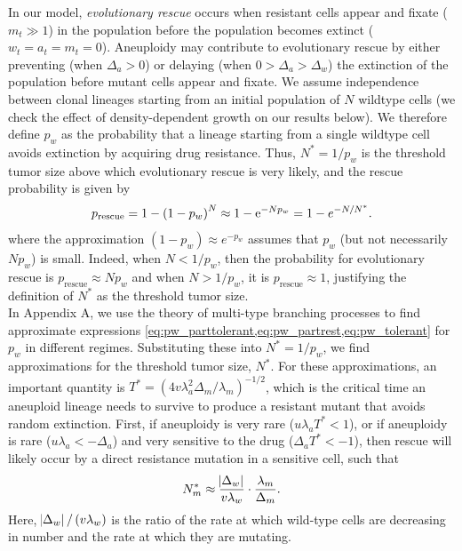 \documentclass[12pt]{extarticle}
\newcommand{\e}{{\rm e}}
\newcommand{\presc}{p_\text{rescue}}
\begin{document}
In our model, \emph{evolutionary rescue} occurs when resistant cells appear and fixate ($m_t \gg 1$) in the population before the population becomes extinct ($w_t=a_t=m_t=0$).
Aneuploidy may contribute to evolutionary rescue by either preventing (when $\Delta_a>0$) or delaying (when $0>\Delta_a>\Delta_w$) the extinction of the population before mutant cells appear and fixate.
We assume independence between clonal lineages starting from an initial population of $N$ wildtype cells (we check the effect of density-dependent growth on our results below).
We therefore define $p_w$ as the probability that a lineage starting from a single wildtype cell avoids extinction by acquiring drug resistance.
Thus, $N^*=1/p_w$ is the threshold tumor size above which evolutionary rescue is very likely, and the rescue probability is given by 
\begin{equation} \label{eq:rescue_prob} 
\presc = 
1-\left(1-p_w\right)^N \approx
1-\e^{-Np_w} = 
1-e^{-N/N^*} .
\end{equation}
where the approximation $(1-p_w)\approx e^{-p_w}$ assumes that $p_w$ (but not necessarily $N p_w$) is small.
Indeed, when $N<1/p_w$, then the probability for evolutionary rescue is $\presc \approx N p_w$  and when $N > 1/p_w$, it is $\presc \approx 1$, justifying the definition of $N^*$ as the threshold tumor size. 
\\
In Appendix A, we use the theory of multi-type branching processes to find approximate expressions \cref{eq:pw_parttolerant,eq:pw_partrest,eq:pw_tolerant} for $p_w$ in different regimes. 
Substituting these  into $N^*=1/p_w$, we find approximations for the threshold tumor size, $N^*$. 
For these approximations, an important quantity is $T^* = (4 v \lambda_a^2 \Delta_m/\lambda_m)^{-1/2}$, which is the critical time an aneuploid lineage needs to survive to produce a resistant mutant that avoids random extinction.
First, if aneuploidy is very rare ($u\lambda_a T^*< 1$), or if aneuploidy is rare ($u\lambda_a < -\Delta_a$) and very sensitive to the drug ($\Delta_a T^* < -1$), then rescue will likely occur by a direct resistance mutation in a sensitive cell, such that 
\begin{equation} \label{eq:N_m}
N_m^* \approx \frac{\abs{\Delta_w}}{v\lambda_w} \cdot \frac{\lambda_m}{\Delta_m} .
\end{equation}
Here, $\abs{\Delta_w}/\left(v\lambda_w\right)$ is the ratio of the rate at which wild-type cells are decreasing in number and the rate at which they are mutating.
\end{document}
